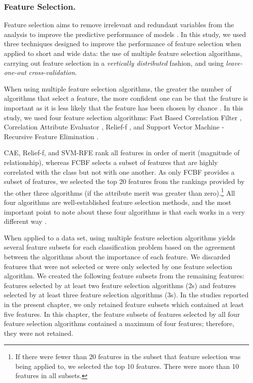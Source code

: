 \documentclass[
  12pt,
  a4paper,
]{book}
\begin{document}
\hypertarget{ml-pra-method-feature-selection}{%
\subsubsection{Feature Selection.}\label{ml-pra-method-feature-selection}}

Feature selection aims to remove irrelevant and redundant variables from the analysis to improve the predictive performance of models \citep{Guyon2003}. In this study, we used three techniques designed to improve the performance of feature selection when applied to short and wide data: the use of multiple feature selection algorithms, carrying out feature selection in a \emph{vertically distributed} fashion, and using \emph{leave-one-out cross-validation}.

When using multiple feature selection algorithms, the greater the number of algorithms that select a feature, the more confident one can be that the feature is important as it is less likely that the feature has been chosen by chance \citep{Visa2011}. In this study, we used four feature selection algorithms: Fast Based Correlation Filter \citep[FCBF;][]{Yu2003}, Correlation Attribute Evaluator \citep[CAE;][]{Bouckaert2018}, Relief-f \citep{Kira1992}, and Support Vector Machine - Recursive Feature Elimination \citep[SVM-RFE;][]{Guyon2002}.

CAE, Relief-f, and SVM-RFE rank all features in order of merit (magnitude of relationship), whereas FCBF selects a subset of features that are highly correlated with the class but not with one another. As only FCBF provides a subset of features, we selected the top 20 features from the rankings provided by the other three algorithms (if the attribute merit was greater than zero).\footnote{If there were fewer than 20 features in the subset that feature selection was being applied to, we selected the top 10 features. There were more than 10 features in all subsets.} All four algorithms are well-established feature selection methods, and the most important point to note about these four algorithms is that each works in a very different way \citep[see][]{Bolon-Canedo2015}.

When applied to a data set, using multiple feature selection algorithms yields several feature subsets for each classification problem based on the agreement between the algorithms about the importance of each feature. We discarded features that were not selected or were only selected by one feature selection algorithm. We created the following feature subsets from the remaining features: features selected by at least two feature selection algorithms (2s) and features selected by at least three feature selection algorithms (3s). In the studies reported in the present chapter, we only retained feature subsets which contained at least five features. In this chapter, the feature subsets of features selected by all four feature selection algorithms contained a maximum of four features; therefore, they were not retained.
\end{document}
